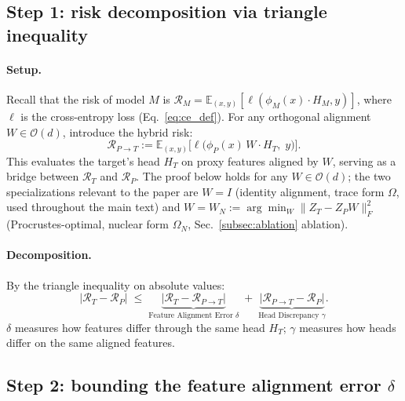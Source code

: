 \subsection{Step 1: risk decomposition via triangle inequality}
\label{app:risk_decomp}

\paragraph{Setup.}
Recall that the risk of model $M$ is $\mathcal{R}_M = \mathbb{E}_{(x,y)}[\ell(\phi_M(x) \cdot H_M, y)]$, where $\ell$ is the cross-entropy loss (Eq.~\ref{eq:ce_def}). For any orthogonal alignment $W \in \mathcal{O}(d)$, introduce the hybrid risk:
\begin{equation}
\mathcal{R}_{P \to T} := \mathbb{E}_{(x,y)}\!\Big[\ell\!\big(\phi_P(x)\, W \cdot H_T,\; y\big)\Big].
\end{equation}
This evaluates the target's head $H_T$ on proxy features aligned by $W$, serving as a bridge between $\mathcal{R}_T$ and $\mathcal{R}_P$. The proof below holds for any $W \in \mathcal{O}(d)$; the two specializations relevant to the paper are $W = I$ (identity alignment, trace form $\Omega$, used throughout the main text) and $W = W_N := \arg\min_W \|Z_T - Z_P W\|_F^2$ (Procrustes-optimal, nuclear form $\Omega_N$, Sec.~\ref{subsec:ablation} ablation).

\paragraph{Decomposition.}
By the triangle inequality on absolute values:
\begin{equation}
\label{eq:app_triangle}
|\mathcal{R}_T - \mathcal{R}_P| \;\le\; \underbrace{\big|\mathcal{R}_T - \mathcal{R}_{P \to T}\big|}_{\text{Feature Alignment Error } \delta} \;+\; \underbrace{\big|\mathcal{R}_{P \to T} - \mathcal{R}_P\big|}_{\text{Head Discrepancy } \gamma}.
\end{equation}
$\delta$ measures how features differ through the same head $H_T$; $\gamma$ measures how heads differ on the same aligned features.


\subsection{Step 2: bounding the feature alignment error $\delta$}
\label{app:kfeat}

